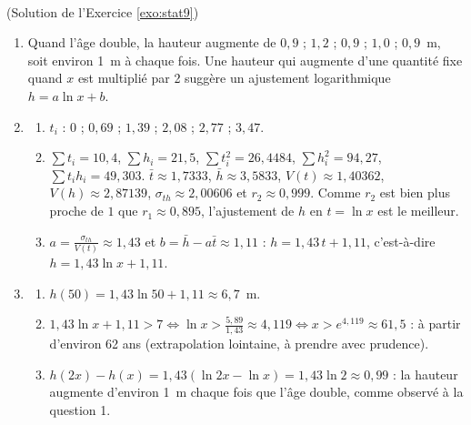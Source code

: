\begin{corrige}
\begin{sol} ~ \\
(Solution de l'Exercice \ref{exo:stat9})
\begin{enumerate}
\item Quand l'\^age double, la hauteur augmente de $0,9$ ; $1,2$ ; $0,9$ ; $1,0$ ; $0,9$~m, soit environ 1~m \`a chaque fois.
      Une hauteur qui augmente d'une quantit\'e fixe quand $x$ est multipli\'e par 2 sugg\`ere un ajustement logarithmique $h = a \ln x + b$.
\item \begin{enumerate}
      \item $t_i$ : $0$ ; $0,69$ ; $1,39$ ; $2,08$ ; $2,77$ ; $3,47$.
      \item $\sum t_i = 10,4$, $\sum h_i = 21,5$, $\sum t_i^2 = 26,4484$, $\sum h_i^2 = 94,27$, $\sum t_i h_i = 49,303$.
            $\bar{t} \approx 1,7333$, $\bar{h} \approx 3,5833$, $V(t) \approx 1,40362$, $V(h) \approx 2,87139$,
            $\sigma_{th} \approx 2,00606$ et $r_2 \approx 0,999$.
            Comme $r_2$ est bien plus proche de $1$ que $r_1 \approx 0,895$, l'ajustement de $h$ en $t = \ln x$ est le meilleur.
      \item $a = \frac{\sigma_{th}}{V(t)} \approx 1,43$ et $b = \bar{h} - a\bar{t} \approx 1,11$ :
            $h = 1,43\, t + 1,11$, c'est-\`a-dire $\boxed{h = 1,43 \ln x + 1,11}$.
      \end{enumerate}
\item \begin{enumerate}
      \item $h(50) = 1,43 \ln 50 + 1,11 \approx 6,7$~m.
      \item $1,43 \ln x + 1,11 > 7 \iff \ln x > \frac{5,89}{1,43} \approx 4,119 \iff x > e^{4,119} \approx 61,5$ :
            \`a partir d'environ 62 ans (extrapolation lointaine, \`a prendre avec prudence).
      \item $h(2x) - h(x) = 1,43 (\ln 2x - \ln x) = 1,43 \ln 2 \approx 0,99$ : la hauteur augmente d'environ 1~m chaque fois
            que l'\^age double, comme observ\'e \`a la question 1.
      \end{enumerate}
\end{enumerate}
\end{sol}


\end{corrige}

